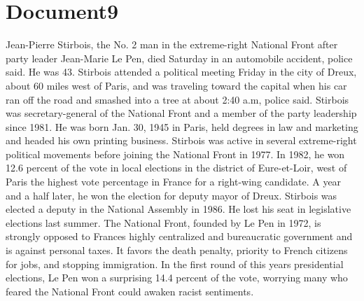 \documentclass{article}
\begin{document}
\color[rgb]{0,0,0}\section{Document9}
\color[rgb]{0.7098039215686275,0.00392156862745098,0.15294117647058825}Jean-Pierre Stirbois, the No. 2 man in the extreme-right National Front after party leader Jean-Marie Le Pen, died Saturday in an automobile \color[rgb]{0.7333333333333333,0.09803921568627451,0.40784313725490196}accident, \color[rgb]{0.7098039215686275,0.00392156862745098,0.15294117647058825}police said. He was 43. Stirbois attended a political meeting Friday in the city of Dreux, about 60 miles west of Paris, and was traveling toward the capital when his car ran off the road and smashed into a tree at about 2:40 a.m, police said. Stirbois was secretary-general of the National Front and a member of the party leadership since 1981. He was born Jan. 30, 1945 in Paris, held \color[rgb]{0.3333333333333333,0.6588235294117647,0.9686274509803922}degrees in law and marketing and \color[rgb]{0.7098039215686275,0.00392156862745098,0.15294117647058825}headed his own printing business. Stirbois was active in several extreme-right political movements before joining the National Front in 1977. In 1982, he won 12.6 percent of the vote in local elections in the district of Eure-et-Loir, west of Paris  the highest \color[rgb]{0.3333333333333333,0.6588235294117647,0.9686274509803922}vote percentage in \color[rgb]{0.7098039215686275,0.00392156862745098,0.15294117647058825}France for a right-wing candidate. A year and a half later, he won the election for deputy mayor of Dreux. Stirbois was elected a deputy in the National Assembly in 1986. He lost his seat in legislative elections last summer. The National Front, founded by Le Pen in 1972, is strongly opposed to Frances highly centralized and bureaucratic government and is against personal \color[rgb]{0.3333333333333333,0.6588235294117647,0.9686274509803922}taxes. It \color[rgb]{0.7098039215686275,0.00392156862745098,0.15294117647058825}favors the death penalty, priority to French citizens for jobs, and stopping immigration. In the first round of this years presidential elections, Le Pen won a surprising 14.4 percent of the vote, worrying many who feared the National Front could awaken racist sentiments. 
\end{document}
